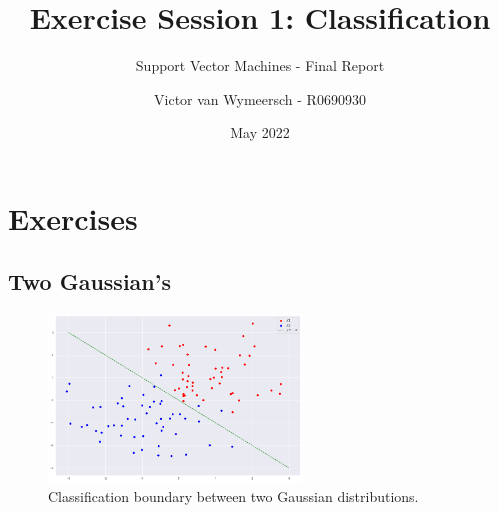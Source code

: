 \documentclass{article}
\title{Exercise Session 1: Classification}
\subtitle{Support Vector Machines - Final Report}
\author{Victor van Wymeersch - R0690930}
\date{May 2022}
\begin{document}
\maketitle

    
    
\section{Exercises}
    \subsection{Two Gaussian's}
        \begin{figure}
            \centering
            \includegraphics[width=0.60\textwidth]{Assignment 1/figures/two_gaussians.png}
            \caption{Classification boundary between two Gaussian distributions. }
            \label{fig:two_gaussians}
        \end{figure}
    
\end{document}
